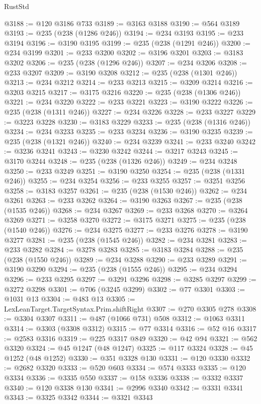 \begin{lexlean}{RustStd}
\begin{coremodule}
{\begin{coremodule}
{{{{{{{{{{{{{{{{{{{{{{{{{{{{{{{{{{{{{{{{{{{{{{{{{{{{{{{{{{{{@3188 := @120 @3186 @733
@3189 := @3163 @3188
@3190 := @564 @3189
@3193 := @235 (@238 (@1286 @246))
@3194 := @234 @3193
@3195 := @233 @3194
@3196 := @3190 @3195
@3199 := @235 (@238 (@1291 @246))
@3200 := @234 @3199
@3201 := @233 @3200
@3202 := @3196 @3201
@3203 := @3183 @3202
@3206 := @235 (@238 (@1296 @246))
@3207 := @234 @3206
@3208 := @233 @3207
@3209 := @3190 @3208
@3212 := @235 (@238 (@1301 @246))
@3213 := @234 @3212
@3214 := @233 @3213
@3215 := @3209 @3214
@3216 := @3203 @3215
@3217 := @3175 @3216
@3220 := @235 (@238 (@1306 @246))
@3221 := @234 @3220
@3222 := @233 @3221
@3223 := @3190 @3222
@3226 := @235 (@238 (@1311 @246))
@3227 := @234 @3226
@3228 := @233 @3227
@3229 := @3223 @3228
@3230 := @3183 @3229
@3233 := @235 (@238 (@1316 @246))
@3234 := @234 @3233
@3235 := @233 @3234
@3236 := @3190 @3235
@3239 := @235 (@238 (@1321 @246))
@3240 := @234 @3239
@3241 := @233 @3240
@3242 := @3236 @3241
@3243 := @3230 @3242
@3244 := @3217 @3243
@3245 := @3170 @3244
@3248 := @235 (@238 (@1326 @246))
@3249 := @234 @3248
@3250 := @233 @3249
@3251 := @3190 @3250
@3254 := @235 (@238 (@1331 @246))
@3255 := @234 @3254
@3256 := @233 @3255
@3257 := @3251 @3256
@3258 := @3183 @3257
@3261 := @235 (@238 (@1530 @246))
@3262 := @234 @3261
@3263 := @233 @3262
@3264 := @3190 @3263
@3267 := @235 (@238 (@1535 @246))
@3268 := @234 @3267
@3269 := @233 @3268
@3270 := @3264 @3269
@3271 := @3258 @3270
@3272 := @3175 @3271
@3275 := @235 (@238 (@1540 @246))
@3276 := @234 @3275
@3277 := @233 @3276
@3278 := @3190 @3277
@3281 := @235 (@238 (@1545 @246))
@3282 := @234 @3281
@3283 := @233 @3282
@3284 := @3278 @3283
@3285 := @3183 @3284
@3288 := @235 (@238 (@1550 @246))
@3289 := @234 @3288
@3290 := @233 @3289
@3291 := @3190 @3290
@3294 := @235 (@238 (@1555 @246))
@3295 := @234 @3294
@3296 := @233 @3295
@3297 := @3291 @3296
@3298 := @3285 @3297
@3299 := @3272 @3298
@3301 := @706 (@3245 @3299)
@3302 := @77 @3301
@3303 := @1031 @13
@3304 := @483 @13
@3305 := LexLeanTarget.TargetSyntax.Prim.shiftRight
@3307 := @270 @3305 @278
@3308 := @3304 @3307
@3311 := @487 (@1066 @731) @508
@3312 := @1063 @3311
@3314 := @3303 (@3308 @3312)
@3315 := @77 @3314
@3316 := @52 @16
@3317 := @2583 @3316
@3319 := @225 @3317 @849
@3320 := @42 @94
@3321 := @562 @3320
@3324 := @45 @1247 (@48 @1247)
@3325 := @117 @3324
@3328 := @45 @1252 (@48 @1252)
@3330 := @351 @3328 @130
@3331 := @120 @3330
@3332 := @2682 @3320
@3333 := @520 @603
@3334 := @574 @3333
@3335 := @120 @3334
@3336 := @3335 @550
@3337 := @158 @3336
@3338 := @3332 @3337
@3340 := @120 @3338 @130
@3341 := @2996 @3340
@3342 := @3331 @3341
@3343 := @3325 @3342
@3344 := @3321 @3343
}}}}}}}}}}}}}}}}}}}}}}}}}}}}}}}}}}}}}}}}}}}}}}}}}}}}}}}}}}}}
\end{coremodule}}
\end{coremodule}
\end{lexlean}
